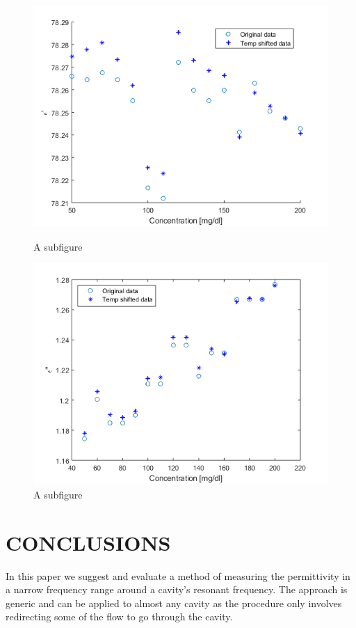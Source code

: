 \documentclass[10pt,final,conference,a4paper,twocolumn]{IEEEtran_AntennEMB_GigaHertz2016}
\begin{document}
\begin{figure}
\begin{subfigures}
	\raggedright
	\includegraphics[width=.50\linewidth]{pumpgluzoomERE.png}
	\caption{A subfigure}
	\label{fig:sub1}
\end{subfigures}
\begin{subfigures}
	\raggedright
	\includegraphics[width=.50\linewidth]{pumpgluzoomEIM.png}
	\caption{A subfigure}
	\label{fig:sub2}
\end{subfigures}
\end{figure}






\section{CONCLUSIONS}
In this paper we suggest and evaluate a method of measuring the permittivity in a narrow frequency range around a cavity's resonant frequency. The approach is generic and can be applied to almost any cavity as the procedure only involves redirecting some of the flow to go through the cavity.
\end{document}
